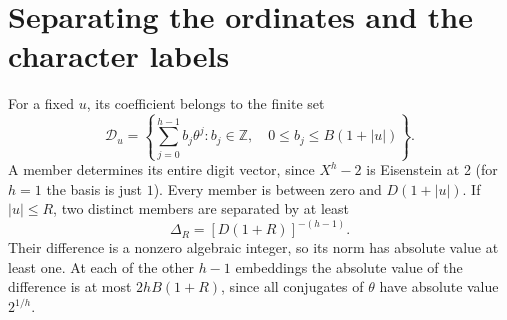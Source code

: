 \documentclass[11pt]{article}
\newcommand{\Z}{\mathbb Z}\newcommand{\R}{\mathbb R}
\begin{document}
\section{Separating the ordinates and the character labels}\label{sec:inverse}
For a fixed $u$, its coefficient belongs to the finite set
\[
 \mathcal D_u=
 \left\{\sum_{j=0}^{h-1} b_j\theta^j:
       b_j\in\Z,\quad 0\le b_j\le B(1+|u|)\right\}.
\]
A member determines its entire digit vector, since $X^h-2$ is Eisenstein at 2 (for $h=1$ the basis is just $1$). Every member is between zero and $D(1+|u|)$. If $|u|\le R$, two distinct members are separated by at least
\begin{equation}
 \Delta_R=[D(1+R)]^{-(h-1)}.\label{eq:sep}
\end{equation}
Their difference is a nonzero algebraic integer, so its norm has absolute value at least one. At each of the other $h-1$ embeddings the absolute value of the difference is at most $2hB(1+R)$, since all conjugates of $\theta$ have absolute value $2^{1/h}$.
\end{document}
